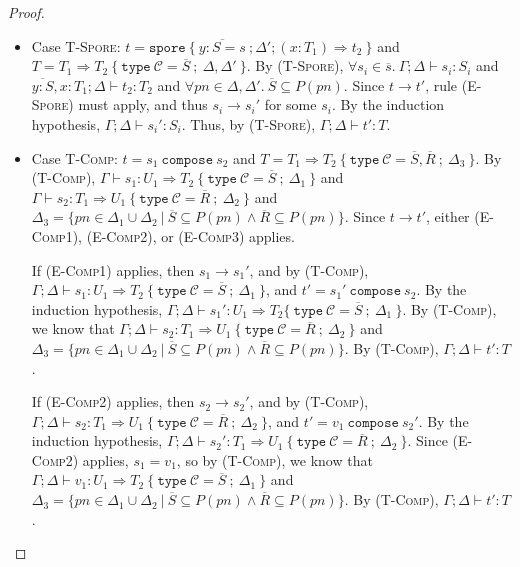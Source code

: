 \documentclass[a4paper,twoside]{article}
\newcommand{\seq}[1]{\overline{#1}}
\begin{document}
\begin{proof}
\begin{itemize}
\item Case \textsc{T-Spore}: $t = \texttt{spore}~\{~\seq{y : S = s}~; \Delta'; (x: T_1) \Rightarrow t_2~\}$ and $T = T_1 \Rightarrow T_2~\{~\texttt{type}~\mathcal{C} = \seq{S}~;~\Delta, \Delta'~\}$. By (\textsc{T-Spore}), $\forall s_i \in \seq{s}.~\Gamma ; \Delta \vdash s_i : S_i$ and $\seq{y : S}, x : T_1 ; \Delta \vdash t_2 : T_2$ and $\forall pn \in \Delta, \Delta'.~\seq{S} \subseteq P(pn)$. Since $t \rightarrow t'$, rule (\textsc{E-Spore}) must apply, and thus $s_i \rightarrow s_i'$ for some $s_i$. By the induction hypothesis, $\Gamma ; \Delta \vdash s_i' : S_i$. Thus, by (\textsc{T-Spore}), $\Gamma ; \Delta \vdash t' : T$.

\item Case \textsc{T-Comp}: $t = s_1~\texttt{compose}~s_2$ and $T = T_1 \Rightarrow T_2~\{~\texttt{type}~\mathcal{C} = \seq{S}, \seq{R}~;~\Delta_3~\}$. By (\textsc{T-Comp}), $\Gamma \vdash s_1 : U_1 \Rightarrow T_2~\{~\texttt{type}~\mathcal{C} = \seq{S}~;~\Delta_1~\}$ and $\Gamma \vdash s_2 : T_1 \Rightarrow U_1~\{~\texttt{type}~\mathcal{C} = \seq{R}~;~\Delta_2~\}$ and $\Delta_3 = \{ pn \in \Delta_1 \cup \Delta_2 ~|~ \seq{S} \subseteq P(pn) \land \seq{R} \subseteq P(pn) \}$. Since $t \rightarrow t'$, either (\textsc{E-Comp1}), (\textsc{E-Comp2}), or (\textsc{E-Comp3}) applies.

If (\textsc{E-Comp1}) applies, then $s_1 \rightarrow s_1'$, and by (\textsc{T-Comp}), $\Gamma ; \Delta \vdash s_1 : U_1 \Rightarrow T_2~\{~\texttt{type}~\mathcal{C} = \seq{S}~;~\Delta_1~\}$, and $t' = s_1'~\texttt{compose}~s_2$. By the induction hypothesis, $\Gamma ; \Delta \vdash s_1' : U_1 \Rightarrow T_2\{~\texttt{type}~\mathcal{C} = \seq{S}~;~\Delta_1~\}$. By (\textsc{T-Comp}), we know that $\Gamma ; \Delta \vdash s_2 : T_1 \Rightarrow U_1~\{~\texttt{type}~\mathcal{C} = \seq{R}~;~\Delta_2~\}$ and $\Delta_3 = \{ pn \in \Delta_1 \cup \Delta_2 ~|~ \seq{S} \subseteq P(pn) \land \seq{R} \subseteq P(pn) \}$. By (\textsc{T-Comp}), $\Gamma ; \Delta \vdash t' : T$.

If (\textsc{E-Comp2}) applies, then $s_2 \rightarrow s_2'$, and by (\textsc{T-Comp}), $\Gamma ; \Delta \vdash s_2 : T_1 \Rightarrow U_1~\{~\texttt{type}~\mathcal{C} = \seq{R}~;~\Delta_2~\}$, and $t' = v_1~\texttt{compose}~s_2'$. By the induction hypothesis, $\Gamma ; \Delta \vdash s_2' : T_1 \Rightarrow U_1~\{~\texttt{type}~\mathcal{C} = \seq{R}~;~\Delta_2~\}$. Since (\textsc{E-Comp2}) applies, $s_1 = v_1$, so by (\textsc{T-Comp}), we know that $\Gamma ; \Delta \vdash v_1 : U_1 \Rightarrow T_2~\{~\texttt{type}~\mathcal{C} = \seq{S}~;~\Delta_1~\}$ and $\Delta_3 = \{ pn \in \Delta_1 \cup \Delta_2 ~|~ \seq{S} \subseteq P(pn) \land \seq{R} \subseteq P(pn) \}$. By (\textsc{T-Comp}), $\Gamma ; \Delta \vdash t' : T$.


\end{itemize}
\end{proof}
\end{document}
